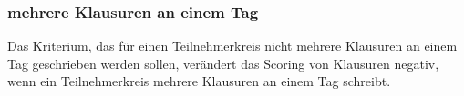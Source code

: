 \subsubsection{mehrere Klausuren an einem Tag}
Das Kriterium, das für einen Teilnehmerkreis nicht mehrere Klausuren an einem Tag geschrieben
werden sollen, verändert das Scoring von Klausuren negativ, wenn ein Teilnehmerkreis
mehrere Klausuren an einem Tag schreibt.